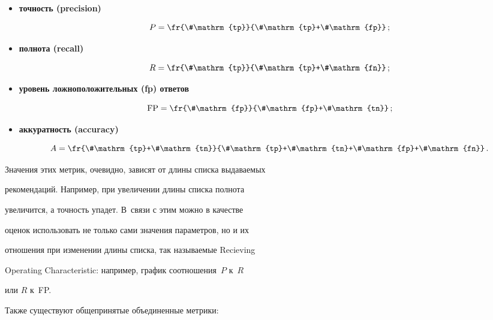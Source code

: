 \begin{itemize}


    \item \textbf{точность (precision)}


$$


P=\fr{\#\mathrm{tp}}{\#\mathrm{tp}+\#\mathrm{fp}}\,;


$$





\item \textbf{полнота (recall)}


$$


R=\fr{\#\mathrm{tp}}{\#\mathrm{tp}+\#\mathrm{fn}}\,;


$$





\item \textbf{уровень ложноположительных (fp) ответов}


$$


\mathrm{FP}=\fr{\#\mathrm{fp}}{\#\mathrm{fp}+\#\mathrm{tn}}\,;


$$





\item \textbf{аккуратность (accuracy)}


$$


A=\fr{\#\mathrm{tp}+\#\mathrm{tn}}{\#\mathrm{tp}+\#\mathrm{tn}+\#\mathrm{fp}+\#\mathrm{fn}}\,.


$$


\end{itemize}





Значения этих метрик, очевидно, зависят от длины списка выдаваемых


рекомендаций. Например, при увеличении длины списка полнота


увеличится, а точность упадет. В~связи с этим можно в качестве


оценок использовать не только сами значения параметров, но и их


отношения при изменении длины списка, так называемые Recieving


Operating Characteristic: например, график соотношения~$P$ к~$R$


или $R$ к~FP.





Также существуют общепринятые объединенные метрики:


